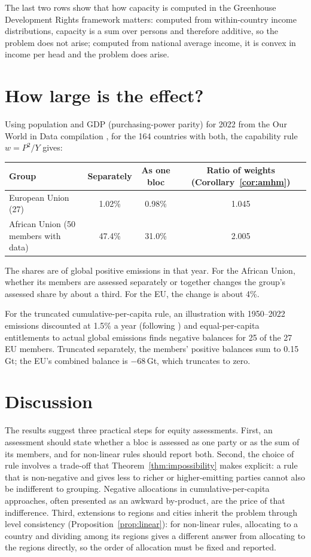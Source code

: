 \documentclass[11pt]{article}
\theoremstyle{definition}
\theoremstyle{remark}
\begin{document}
The last two rows show that how capacity is computed in the Greenhouse Development Rights framework matters: computed from within-country income distributions, capacity is a sum over persons and therefore additive, so the problem does not arise; computed from national average income, it is convex in income per head and the problem does arise.

\section{How large is the effect?}\label{sec:numbers}

Using population and GDP (purchasing-power parity) for 2022 from the Our World in Data compilation \cite{owid}, for the 164 countries with both, the capability rule $w=P^2/Y$ gives:

\begin{center}\small
\begin{tabular}{@{}lccc@{}}
\toprule
Group & Separately & As one bloc & Ratio of weights (Corollary~\ref{cor:amhm})\\
\midrule
European Union (27) & 1.02\% & 0.98\% & 1.045\\
African Union (50 members with data) & 47.4\% & 31.0\% & 2.005\\
\bottomrule
\end{tabular}
\end{center}

\noindent The shares are of global positive emissions in that year. For the African Union, whether its members are assessed separately or together changes the group's assessed share by about a third. For the EU, the change is about 4\%.

For the truncated cumulative-per-capita rule, an illustration with 1950--2022 emissions discounted at 1.5\% a year (following \cite{rdp2023}) and equal-per-capita entitlements to actual global emissions finds negative balances for 25 of the 27 EU members. Truncated separately, the members' positive balances sum to 0.15\,Gt; the EU's combined balance is $-68$\,Gt, which truncates to zero.

\section{Discussion}

The results suggest three practical steps for equity assessments. First, an assessment should state whether a bloc is assessed as one party or as the sum of its members, and for non-linear rules should report both. Second, the choice of rule involves a trade-off that Theorem~\ref{thm:impossibility} makes explicit: a rule that is non-negative and gives less to richer or higher-emitting parties cannot also be indifferent to grouping. Negative allocations in cumulative-per-capita approaches, often presented as an awkward by-product, are the price of that indifference. Third, extensions to regions and cities inherit the problem through level consistency (Proposition~\ref{prop:linear}): for non-linear rules, allocating to a country and dividing among its regions gives a different answer from allocating to the regions directly, so the order of allocation must be fixed and reported.
\end{document}
